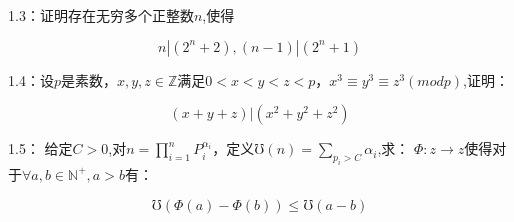 \documentclass{ctexart}
\begin{document}
1.3：证明存在无穷多个正整数$n$,使得
	
		\[
		n|(2^n+2),(n-1)|(2^n+1)
		\]

1.4：设$p$是素数，$x,y,z\in \mathbb{Z}$满足$0<x<y<z<p$，$x^3\equiv y^3\equiv z^3 (mod p)$,证明：
	
		\[
		(x+y+z)|(x^2+y^2+z^2)
		\]


1.5： 给定$C>0$,对$n=\displaystyle\prod_{i=1}^{n} P_{i}^{\alpha_{i}}$，定义$\mho(n)=\displaystyle\sum_{p_i>C} \alpha_{i}$,求：
$\Phi :z \rightarrow z$使得对于$\forall a,b\in \mathbb{N^{+}},a>b$有：

\[\mho (\Phi (a)-\Phi (b))\le \mho (a-b)\]

\end{document}
